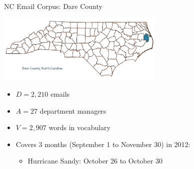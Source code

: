 \documentclass[10pt, xcolor=table]{beamer}
\theoremstyle{definition}
\theoremstyle{remark}
\begin{document}
\begin{frame}{NC Email Corpus: Dare County}
\begin{center}
\includegraphics[width=0.6\textwidth]{figures/dare.png}
\end{center}
 \begin{itemize}
 \item $D = 2,210$ emails
\item  $A = 27$ department managers
\item  $V = 2,907$ words in vocabulary
\item Covers 3 months (September 1 to November 30) in 2012:
  \vspace{0.1cm}
\begin{itemize}
  \item Hurricane Sandy: October 26 to October 30
    \end{itemize}
 \end{itemize}
\end{frame}
\end{document}
